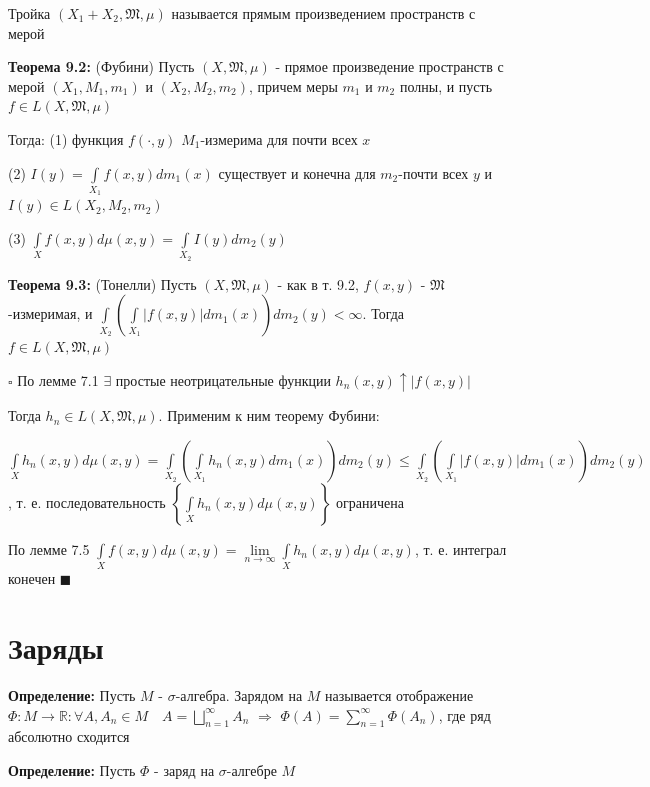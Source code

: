 \documentclass[a4paper]{report}
\begin{document}
Тройка $(X_1+X_2,\mathfrak M,\mu)$ называется прямым произведением пространств с мерой
\bigskip

\noindent\textbf{Теорема 9.2:} (Фубини) Пусть $(X,\mathfrak M,\mu)$ - прямое произведение пространств с мерой $(X_1,M_1,m_1)$ и $(X_2,M_2,m_2)$, причем меры $m_1$ и $m_2$ полны, и пусть $f\in L(X,\mathfrak M,\mu)$

 Тогда: (1) функция $f(\cdot,y)$ $M_1$-измерима для почти всех $x$

(2) $I(y)=\displaystyle\int\limits_{X_1}f(x,y)dm_1(x)$ существует и конечна для $m_2$-почти всех $y$ и $I(y)\in L(X_2,M_2,m_2)$

(3) $\displaystyle\int\limits_X f(x,y)d\mu(x,y)=\displaystyle\int\limits_{X_2}I(y)dm_2(y)$
\bigskip

\noindent\textbf{Теорема 9.3:} (Тонелли) Пусть $(X,\mathfrak M,\mu)$ - как в т. 9.2, $f(x,y)$ - $\mathfrak M$-измеримая, и $\displaystyle\int\limits_{X_2}\left(\displaystyle\int\limits_{X_1}
|f(x,y)|dm_1(x)\right)dm_2(y)<\infty$. Тогда $f\in L(X,\mathfrak M,\mu)$

\noindent $\square$ По лемме 7.1 $\exists$ простые неотрицательные функции $h_n(x,y)\uparrow|f(x,y)|$

Тогда $h_n\in L(X,\mathfrak M,\mu)$. Применим к ним теорему Фубини:

$\displaystyle\int\limits_X h_n(x,y)d\mu(x,y)=\displaystyle\int\limits_{X_2}\left(\displaystyle\int\limits_{X_1}h_n(x,y)dm_1(x)\right)dm_2(y)\le\displaystyle\int\limits_{X_2}\left(\displaystyle\int\limits_{X_1}|f(x,y)|dm_1(x)\right)dm_2(y)$, т. е. последовательность $\left\{\displaystyle\int\limits_X h_n(x,y)d\mu(x,y)\right\}$ ограничена

По лемме 7.5 $\displaystyle\int\limits_X f(x,y)d\mu(x,y)=\lim\limits_{n\to\infty}\displaystyle\int\limits_X h_n(x,y)d\mu(x,y)$, т. е. интеграл конечен $\blacksquare$





\chapter{Заряды}

\noindent\textbf{Определение:} Пусть $M$ - $\sigma$-алгебра. Зарядом на $M$ называется отображение $\Phi\colon M\to\mathbb R\colon\forall A,A_n\in M\quad A=\bigsqcup\limits_{n=1}^\infty A_n$ $\Rightarrow$ $\Phi(A)=\sum\limits_{n=1}^\infty\Phi(A_n)$, где ряд абсолютно сходится
\bigskip

\noindent\textbf{Определение:} Пусть $\Phi$ - заряд на $\sigma$-алгебре $M$
\end{document}
